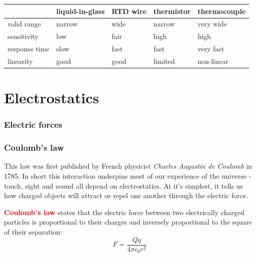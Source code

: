 \documentclass[a4paper,12pt]{book}
\newcommand{\cmt}{}
\newenvironment{ilight}
  {\centering
  	\vspace*{6pt}
  	\begin{tcolorbox}[colframe=Gray,colback=LightGrey!15]
  \setlength{\baselineskip}{\baselineskip}%
  }
  {\end{tcolorbox}\vspace*{-4pt}}
\newcommand{\keypoint}[1]{\textbf{\textcolor{red}{#1}}}
\newenvironment{fullwidth}{}{}
\newcommand{\tcbhighmath}[1]{\boxed{#1}}
\newcommand{\keypoint}[1]{\textbf{\textcolor{red}{#1}}}
\newcommand{\cmt}{}
\begin{document}
%
\begin{fullwidth}
    

\begin{center}
	\begin{tabular}{|l|C{2.4cm}|C{2.4cm}|C{2.4cm}|C{2.4cm}|}
		\hline 
		& liquid-in-glass & RTD wire & thermistor & thermocouple \\ 
		\hline 
		valid range & narrow & wide & narrow & very wide \\ 
		\hline 
		sensitivity & low & fair & high & high \\ 
		\hline 
		response time & slow & fast & fast & very fast \\ 
		\hline 
		linearity & good & good & limited & non-linear \\ 
		\hline 
	\end{tabular} 
\end{center}
\end{fullwidth}

\cleardoublepage

\chapter{Electrostatics}

\subsection{Electric forces}

\subsection{Coulomb's law}
This law was first published by French physicist \emph{Charles Augustin de Coulomb} in 1785. In short this interaction underpins most of our experience of the universe - touch, sight and sound all depend on electrostatics. At it's simplest, it tells us how charged objects will attract or repel one another through the electric force.

\begin{ilight}
	\keypoint{Coulomb's law} states that the electric force between two electrically charged particles is proportional to their charges and inversely proportional to the square of their separation: $$\tcbhighmath{F = \frac{Qq}{4\pi\epsilon_0 r^2}}$$
\end{ilight}
\end{document}
